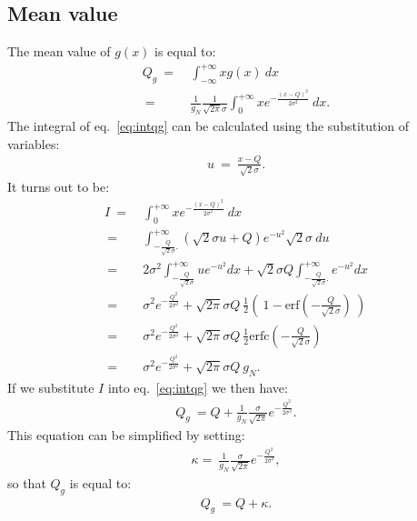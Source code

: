 \documentclass[a4paper,11pt]{article}
\begin{document}
%


\subsection*{Mean value}
%

The mean value of $g(x)$ is equal to:
\begin{align}
Q_g \  = \ & \int_{-\infty}^{+\infty} x g(x) \ dx \nonumber \\
\  = \ &  \frac{1}{g_N}\frac{1}{\sqrt{2\pi}\sigma} \int_{0}^{+\infty} x e^{-\frac{(x-Q)^2}{2\sigma^2}} \ dx. \label{eq:intqg}
\end{align}
The integral of eq.~\eqref{eq:intqg} can be calculated using the substitution of variables:
\begin{align}
u \  = \ \frac{x-Q}{\sqrt{2}\sigma}.
\end{align}
It turns out to be:
\begin{align}
I \  = \ & \int_{0}^{+\infty} x e^{-\frac{(x-Q)^2}{2\sigma^2}} \ dx \nonumber \\
\  = \ & \int_{  -\frac{Q}{\sqrt{2}\sigma}.  }^{+\infty}  ( \sqrt{2}\sigma u + Q ) e^{-u^2} \sqrt{2}\sigma \ du \nonumber \\
\  = \ & 2 \sigma^2 \int_{  -\frac{Q}{\sqrt{2}\sigma} }^{+\infty}  u  e^{-u^2}  dx + \sqrt{2}\sigma Q \int _{  -\frac{Q}{\sqrt{2}\sigma}.  }^{+\infty} e^{-u^2}  dx \nonumber \\
\  = \ & \sigma^2 e^{-  \frac{Q^2}{2\sigma^2 } } + \sqrt{2\pi}\sigma Q \ \frac{1}{2}\left( \ 1 - \text{erf}\left( -\frac{Q}{\sqrt{2}\sigma} \right) \ \right) \nonumber \\
\  = \ & \sigma^2 e^{-  \frac{Q^2}{2\sigma^2 } } + \sqrt{2\pi}\sigma Q \  \frac{1}{2} \text{erfc}\left( -\frac{Q}{\sqrt{2}\sigma} \right)  \nonumber \\
\  = \ & \sigma^2 e^{-  \frac{Q^2}{2\sigma^2 } } + \sqrt{2\pi}\sigma Q \ g_N.
\end{align}
If we substitute $I$ into eq.~\eqref{eq:intqg} we then have:
\begin{align}
Q_g \  = Q +\frac{1}{g_N}\frac{\sigma}{\sqrt{2\pi}} e^{-  \frac{Q^2}{2\sigma^2 } }. 
\end{align}
This equation can be simplified by setting: 
\begin{align}
\kappa  = \  \frac{1}{g_N}\frac{\sigma}{\sqrt{2\pi}} e^{-  \frac{Q^2}{2\sigma^2 } },
\end{align}
so that $Q_g$ is equal to:
\begin{align}
Q_g \  = Q + \kappa. 
\end{align}
\end{document}
